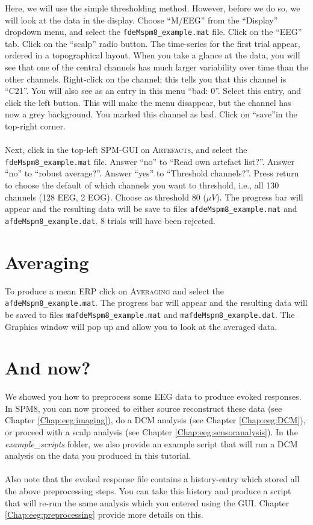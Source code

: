 Here, we will use the simple thresholding method. However, before we do so, we will look at the data in the display. Choose ``M/EEG'' from the ``Display'' dropdown menu, and select the \texttt{fdeMspm8\_example.mat} file. Click on the ``EEG'' tab. Click on the ``scalp'' radio button. The time-series for the first trial appear, ordered in a topographical layout. When you take a glance at the data, you will see that one of the central channels has much larger variability over time than the other channels. Right-click on the channel; this tells you that this channel is ``C21''. You will also see as an entry in this menu ``bad: 0''. Select this entry, and click the left button. This will make the menu disappear, but the channel has now a grey background. You marked this channel as bad. Click on ``save''in the top-right corner.
\\
\\
Next, click in the top-left SPM-GUI on \textsc{Artefacts}, and select the \texttt{fdeMspm8\_example.mat} file. Answer ``no'' to ``Read own artefact list?''. Answer ``no'' to ``robust average?''. Answer ``yes'' to ``Threshold channels?''. Press return to choose the default of which channels you want to threshold, i.e., all 130 channels (128 EEG, 2 EOG). Choose as threshold 80 ($\mu V$). The progress bar will appear and the resulting data will be save to files \texttt{afdeMspm8\_example.mat} and \texttt{afdeMspm8\_example.dat}. 8 trials will have been rejected.

\section{Averaging}
To produce a mean ERP click on \textsc{Averaging} and select the \texttt{afdeMspm8\_example.mat}. The progress bar will appear and the resulting data will be saved to files \texttt{mafdeMspm8\_example.mat} and \texttt{mafdeMspm8\_example.dat}. The Graphics window will pop up and allow you to look at the averaged data.

\section{And now?}
We showed you how to preprocess some EEG data to produce evoked responses. In SPM8, you can now proceed to either source reconstruct these data (see Chapter \ref{Chap:eeg:imaging}), do a DCM analysis (see Chapter \ref{Chap:eeg:DCM}), or proceed with a scalp analysis (see Chapter \ref{Chap:eeg:sensoranalysis}). In the \textit{example\_scripts} folder, we also provide an example script that will run a DCM analysis on the data you produced in this tutorial. 
\\
\\
Also note that the evoked response file contains a history-entry which stored all the above preprocessing steps. You can take this history and produce a script that will re-run the same analysis which you entered using the GUI. Chapter \ref{Chap:eeg:preprocessing} provide more details on this.
